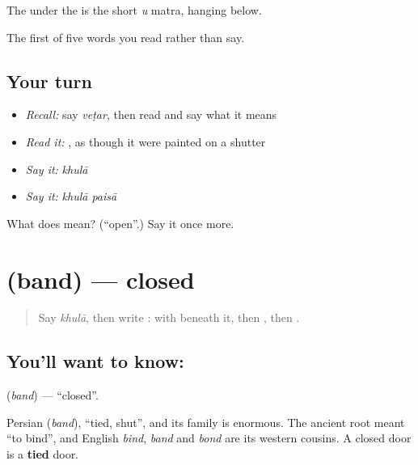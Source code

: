The  under the  is the short \emph{u} matra, hanging below.

\begin{grammarlens}[title={What you've built}]
The first of five words you read rather than say.
\end{grammarlens}

\subsection*{Your turn}
\begin{itemize}
\raggedright
  \item \emph{Recall:} say \emph{veṭar}, then read \textbf{} and say what it means
  \item \emph{Read it:} , as though it were painted on a shutter
  \item \emph{Say it:} \emph{khulā}
  \item \emph{Say it:} \emph{khulā paisā}
\end{itemize}

\begin{tcolorbox}[breakable,colback=teal!4,colframe=teal!35!black,title={Before you move on}]
What does  mean? (\textquotedblleft{}open\textquotedblright{}.) Say it once more.
\end{tcolorbox}
\section[band]{ (band) — closed}

\label{lesson:HI-C74-closed}



\begin{quote}
Say \emph{khulā}, then write \textbf{}:  with  beneath it, then , then .
\end{quote}

\subsection*{You'll want to know: }
\textbf{} (\emph{band}) — \textquotedblleft{}closed\textquotedblright{}.

Persian  (\emph{band}), \textquotedblleft{}tied, shut\textquotedblright{}, and its family is enormous. The ancient root meant \textquotedblleft{}to bind\textquotedblright{}, and English \emph{bind}, \emph{band} and \emph{bond} are its western cousins. A closed door is a \textbf{tied} door.

